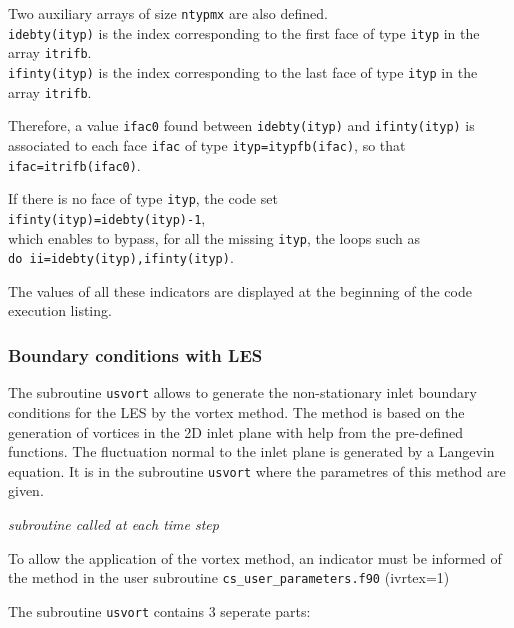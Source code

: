 {{{Two auxiliary arrays of size \texttt{ntypmx} are also defined.\\
\texttt{idebty(ityp)} is the index
corresponding to the first
face of type \texttt{ityp} in the array \texttt{itrifb}.\\
\texttt{ifinty(ityp)} is the index
corresponding to the last
face of type \texttt{ityp} in the array \texttt{itrifb}.

Therefore, a value \texttt{ifac0} found between \texttt{idebty(ityp)} and
\texttt{ifinty(ityp)} is associated to each face \texttt{ifac} of type
\texttt{ityp=itypfb(ifac)}, so that \texttt{ifac=itrifb(ifac0)}.

If there is no face of type \texttt{ityp}, the code set \\
\texttt{ifinty(ityp)=idebty(ityp)-1},\\
which enables to bypass, for all the missing \texttt{ityp}, the loops such as \\
\texttt{do ii=idebty(ityp),ifinty(ityp)}.

The values of all these indicators are displayed at the beginning of the
code execution listing.

\subsubsection[Boundary conditions with LES]
{Boundary conditions with LES}
\label{prg_usvort}%
The subroutine \texttt{usvort} allows to generate the non-stationary inlet boundary
conditions for the LES by the vortex method. The method is based on
 the generation of vortices in the 2D inlet plane with help from
the pre-defined functions. The fluctuation normal to the inlet plane
is generated by a Langevin equation. It is in the subroutine \texttt{usvort}
 where the parametres of this method are given.

\noindent
\textit{subroutine called at each time step}

To allow the application of the vortex method, an indicator must be informed of
the method in the user subroutine \texttt{cs\_user\_parameters.f90} (ivrtex=1)

The subroutine \texttt{usvort} contains 3 seperate parts:

}}}
